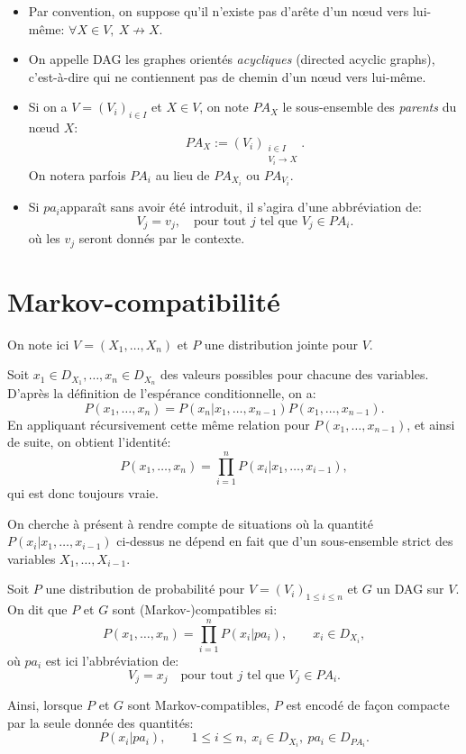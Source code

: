 \begin{itemize}
(resp. l'absence) d'une arête orientée de \(X\) vers \(Y\).
\item Par convention, on suppose qu'il n'existe pas d'arête d'un n\oe ud
vers lui-même: \(\forall X\in V,\ X\not \to X\).
\item On appelle DAG les graphes orientés \emph{acycliques} (directed acyclic
graphs), c'est-à-dire qui ne contiennent pas de chemin d'un n\oe ud vers
lui-même.
\item Si on a \(V=(V_i)_{i\in I}\) et $X\in V$, on note \(PA_X\) le
  sous-ensemble  des \emph{parents} du n\oe ud \(X\):
\[ PA_X:=\left( V_i \right)_{\substack{i\in I\\V_i\to X}}. \]
On notera parfois \(PA_i\) au lieu de \(PA_{X_i}\) ou \(PA_{V_i}\).
\item Si \og\(pa_i\)\fg apparaît sans avoir été introduit, il s'agira d'une
abbréviation de:
\[ V_j=v_j,\quad \text{pour tout $j$ tel que $V_j\in PA_i$}. \]
où les \(v_j\) seront donnés par le contexte.
\end{itemize}

\section{Markov-compatibilité}
\label{sec:markov-compatibilite}


On note ici \(V=\left( X_1,\dots,X_n \right)\) et \(P\) une distribution
jointe pour \(V\).
\begin{remark}
Soit $x_1\in D_{X_1},\dots,x_n\in D_{X_n}$ des valeurs possibles pour chacune des variables.
D'après la définition de l'espérance conditionnelle, on a:
\[ P(x_1,\dots,x_n)=P(x_n|x_1,\dots,x_{n-1})P(x_1,\dots,x_{n-1}). \]
En appliquant récursivement cette même relation pour $P(x_1,\dots,x_{n-1})$, et ainsi de suite, on obtient l'identité:
\[ P(x_1,\dots,x_n)=\prod_{i=1}^nP(x_i|x_1,\dots,x_{i-1}), \]
qui est donc toujours vraie.
\end{remark}

On cherche à présent à rendre compte de situations où la quantité
\(P(x_i|x_1,\dots,x_{i-1})\) ci-dessus ne dépend en fait que d'un
sous-ensemble strict des variables \(X_1,\dots,X_{i-1}\).

\begin{definition}
\label{def:markov-compatibilite}
Soit $P$ une distribution de probabilité pour $V=(V_i)_{1\leqslant i\leqslant n}$ et $G$ un DAG sur $V$. 
On dit que $P$ et $G$ sont (Markov-)compatibles si:
\[ P(x_1,\dots,x_n)=\prod_{i=1}^nP(x_i|pa_i),\qquad x_i\in D_{X_i}, \]
où $pa_i$ est ici l'abbréviation de:
\[ V_j=x_j\quad \text{pour tout $j$ tel que $V_j\in PA_i$}. \]
\end{definition}
\begin{remark}
Ainsi, lorsque $P$ et $G$ sont Markov-compatibles, $P$ est encodé de façon compacte par la seule donnée des quantités:
\[ P(x_i|pa_i),\qquad 1 \leqslant i \leqslant n,\ x_i\in D_{X_i},\ pa_i\in D_{PA_i}. \]
\end{remark}


